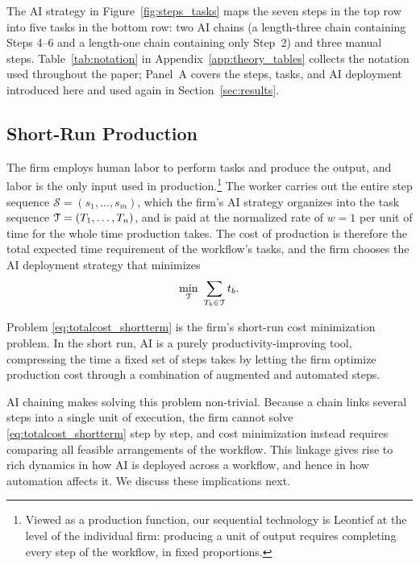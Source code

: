 The AI strategy in Figure~\ref{fig:steps_tasks} maps the seven steps in the top row into five tasks in the bottom row: two AI chains (a length-three chain containing Steps 4--6 and a length-one chain containing only Step~2) and three manual steps.
Table~\ref{tab:notation} in Appendix~\ref{app:theory_tables} collects the notation used throughout the paper; Panel~A covers the steps, tasks, and AI deployment introduced here and used again in Section~\ref{sec:results}.



\subsection{Short-Run Production}
\label{sec:shortrun.production}

The firm employs human labor to perform tasks and produce the output, and labor is the only input used in production.\footnote{
Viewed as a production function, our sequential technology is Leontief at the level of the individual firm: producing a unit of output requires completing every step of the workflow, in fixed proportions.
}
The worker carries out the entire step sequence $\mathcal{S} = (s_1, \dotsc, s_m)$, which the firm's AI strategy organizes into the task sequence $\mathcal{T} = (T_1, \dotsc, T_n)$, and is paid at the normalized rate of $w = 1$ per unit of time for the whole time production takes.
The cost of production is therefore the total expected time requirement of the workflow's tasks, and the firm chooses the AI deployment strategy that minimizes
\begin{align}
\label{eq:totalcost_shortterm}
\min_{\mathcal{T}} \ \sum_{T_b \in \mathcal{T}} t_{b}.
\end{align}

Problem \eqref{eq:totalcost_shortterm} is the firm's short-run cost minimization problem.
In the short run, AI is a purely productivity-improving tool, compressing the time a fixed set of steps takes by letting the firm optimize production cost through a combination of augmented and automated steps.

AI chaining makes solving this problem non-trivial.
Because a chain links several steps into a single unit of execution, the firm cannot solve \eqref{eq:totalcost_shortterm} step by step, and cost minimization instead requires comparing all feasible arrangements of the workflow.
This linkage gives rise to rich dynamics in how AI is deployed across a workflow, and hence in how automation affects it.
We discuss these implications next.